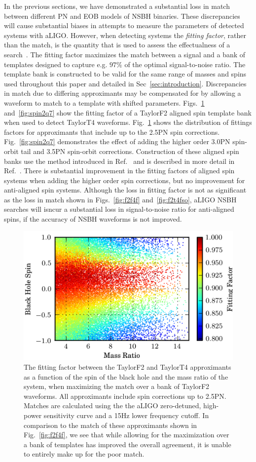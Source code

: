 In the previous sections, we have demonstrated a substantial loss in match between
different \ac{PN} and EOB models of \ac{NSBH} binaries. These discrepancies
will cause substantial biases in attempts to measure the parameters of
detected systems with aLIGO. However, when detecting systems the
\emph{fitting factor}, rather than the match, is the quantity that is used to
assess the effectualness of a search~\cite{Apostolatos:1996rf}. The fitting
factor maximizes the match between a signal and a bank of templates designed
to capture e.g. $97\%$ of the optimal signal-to-noise ratio. The template bank is constructed to be 
valid for the same range of masses and spins used
throughout this paper and detailed in Sec~\ref{sec:introduction}. Discrepancies in
match due to differing approximants may be compensated for by allowing a waveform
to match to a template with shifted parameters.
Figs.~\ref{fig:spin2q} and~\ref{fig:spin2q7} show the fitting
factor of a TaylorF2 aligned spin template bank when used to detect TaylorT4
waveforms. Fig.~\ref{fig:spin2q} shows the distribution of fittings factors for approximants that include up to the 2.5\ac{PN} 
spin corrections. Fig.~\ref{fig:spin2q7} demonstrates the effect of adding the higher order
3.0\ac{PN} spin-orbit tail and 3.5\ac{PN} spin-orbit corrections.
Construction of these aligned spin banks use the method introduced
in Ref.~\cite{Brown:2012qf} and is described in more detail in Ref.~\cite{Harry:2013tca}.
There is substantial improvement in the fitting factors of aligned spin systems when
adding the higher order spin corrections, but no improvement for anti-aligned spin systems. 
Although the loss in fitting factor is not as significant as the loss in match shown in
Figs.~\ref{fig:f2f4f} and~\ref{fig:f2t4fso}, aLIGO \ac{NSBH} searches will isncur a substantial loss in 
signal-to-noise ratio for anti-aligned spins, if the accuracy of \ac{NSBH} waveforms is not improved. 

\begin{figure}
\begin{center}
\includegraphics[width=1.0	extwidth]{papers/nsbh_faithfulness/figure13.png}
\end{center}
\caption{\label{fig:spin2q}The fitting factor between the TaylorF2 and
TaylorT4 approximants as a function of the spin of the black hole
and the mass ratio of the system, when maximizing the match over a bank of
TaylorF2 waveforms. All approximants include spin corrections up to 2.5\ac{PN}.
Matches are calculated using the the aLIGO
zero-detuned, high-power sensitivity curve and a 15Hz lower frequency cutoff. In 
comparison to the match of these approximants shown in Fig.~\ref{fig:f2f4f}, we see that
while allowing for the maximization over a bank of templates has improved the overall agreement, 
it is unable to entirely make up for the poor match. 
}
\end{figure}

